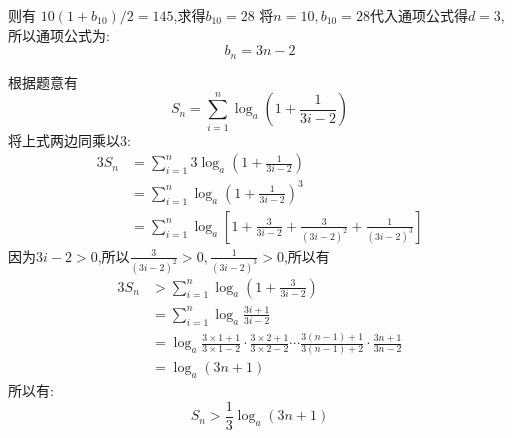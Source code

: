 \begin{questions}
\begin{solution}
\begin{penum}
			      则有
			      \begin{math}
				      10(1+b_{10})/2=145
			      \end{math},求得$b_{10}=28$
			      将$n=10, b_{10}=28$代入通项公式得$d=3$,所以通项公式为:
			      \begin{equation*}
				      b_n = 3n - 2
			      \end{equation*}
			\item 根据题意有
			      \begin{equation*}
				      S_n = \sum_{i=1}^n\log_a(1+\frac{1}{3i-2})
			      \end{equation*}
			      将上式两边同乘以$3$:
			      \begin{align*}
				      3S_n & = \sum_{i=1}^n3\log_a(1+\frac1{3i-2})                                        \\
				           & = \sum_{i=1}^n\log_a(1+\frac1{3i-2})^3                                       \\
				           & = \sum_{i=1}^n\log_a[1+\frac{3}{3i-2}+\frac{3}{(3i-2)^2} + \frac1{(3i-2)^3}]
			      \end{align*}
			      因为$3i-2>0$,所以$\frac3{(3i-2)^2} > 0, \frac1{(3i-2)^3}>0$,所以有
			      \begin{align*}
				      3S_n & > \sum_{i=1}^n\log_a(1+\frac3{3i-2})    \\
				           & = \sum_{i=1}^n\log_a\frac{3i+1}{3i-2}   \\
				           & = \log_a\frac{3\times1 + 1}{3\times1-2}
				      \cdot\frac{3\times2+1}{3\times2-2}
				      \cdots
				      \frac{3(n-1) +1}{3(n-1)+2}
				      \cdot \frac{3n + 1}{3n-2}                      \\
				           & = \log_a(3n+1)
			      \end{align*}
			      所以有:
			      \begin{equation*}
				      S_n > \frac13\log_a(3n+1)
			      \end{equation*}
		\end{penum}
	\end{solution}
\end{questions}
